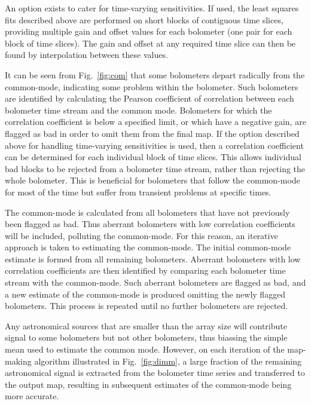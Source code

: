 \documentclass[useAMS,usenatbib,nofootinbib]{mn2e}
\begin{document}
An option exists to cater for time-varying sensitivities. If used, the
least squares fits described above are performed on short blocks of
contiguous time slices, providing multiple gain and offset values for
each bolometer (one pair for each block of time slices). The gain and
offset at any required time slice can then be found by interpolation
between these values.

It can be seen from Fig.~\ref{fig:com} that some bolometers depart
radically from the common-mode, indicating some problem within the
bolometer. Such bolometers are identified by calculating the Pearson
coefficient of correlation between each bolometer time stream and the
common mode. Bolometers for which the correlation coefficient is below a
specified limit, or which have a negative gain, are flagged as bad in
order to omit them from the final map. If the option described above for
handling time-varying sensitivities is used, then a correlation
coefficient can be determined for each individual block of time slices.
This allows individual bad blocks to be rejected from a bolometer time
stream, rather than rejecting the whole bolometer. This is beneficial for
bolometers that follow the common-mode for most of the time but suffer
from transient problems at specific times.

The common-mode is calculated from all bolometers that have not
previously been flagged as bad. Thus aberrant bolometers with low
correlation coefficients will be included, polluting the common-mode. For
this reason, an iterative approach is taken to estimating the common-mode.
The initial common-mode estimate is formed from all remaining bolometers.
Aberrant bolometers with low correlation coefficients are then identified
by comparing each bolometer time stream with the common-mode. Such
aberrant bolometers are flagged as bad, and a new estimate of the
common-mode is produced omitting the newly flagged bolometers. This
process is repeated until no further bolometers are rejected.

Any astronomical sources that are smaller than the array size will
contribute signal to some bolometers but not other bolometers, thus
biassing the simple mean used to estimate the common mode. However, on
each iteration of the map-making algorithm illustrated in
Fig.~\ref{fig:dimm}, a large fraction of the remaining astronomical
signal is extracted from the bolometer time series and transferred to the
output map, resulting in subsequent estimates of the common-mode being
more accurate.
\end{document}
